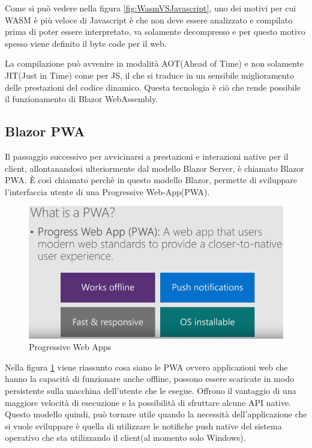 Come si pu\`o vedere nella figura \ref{fig:WasmVSJavascript}, uno dei motivi per cui WASM \`e pi\`u veloce di Javascript \`e che non deve essere analizzato e compilato prima di poter essere interpretato, va solamente decompresso e per questo motivo spesso viene definito il byte code per il web.

La compilazione pu\`o avvenire in modalit\`a AOT(Ahead of Time) e non solamente JIT(Just in Time) come per JS, il che si traduce in un sensibile miglioramento delle prestazioni del codice dinamico.
Questa tecnologia \`e ci\`o che rende possibile il funzionamento di Blazor WebAssembly.

\subsection{Blazor PWA}\label{sez:bpwa}
Il passaggio successivo per avvicinarsi a prestazioni e interazioni native per il client, allontanandosi ulteriormente dal modello Blazor Server, \`e chiamato Blazor PWA.
\`E cos\`i chiamato perch\`e in questo modello Blazor, permette di sviluppare l'interfaccia utente di una Progressive Web-App(PWA).

\begin{figure}[H]
	\centerline{\includegraphics[scale=0.5]{figure/ProgressiveWebApp.png}}
	\caption{Progressive Web Apps}
	\label{fig:WhatIsAPWA}
\end{figure}

Nella figura \ref{fig:WhatIsAPWA} viene riassunto cosa siano le PWA ovvero applicazioni web che hanno la capacit\`a di funzionare anche offline, possono essere scaricate in modo persistente sulla macchina dell'utente che le esegue.
Offrono il vantaggio di una maggiore velocit\`a di esecuzione e la possibilit\`a di sfruttare alcune API native.
Questo modello quindi, pu\`o tornare utile quando la necessit\`a dell'applicazione che si vuole sviluppare \`e quella di utilizzare le notifiche push native del sistema operativo che sta utilizzando il client(al momento solo Windows).

